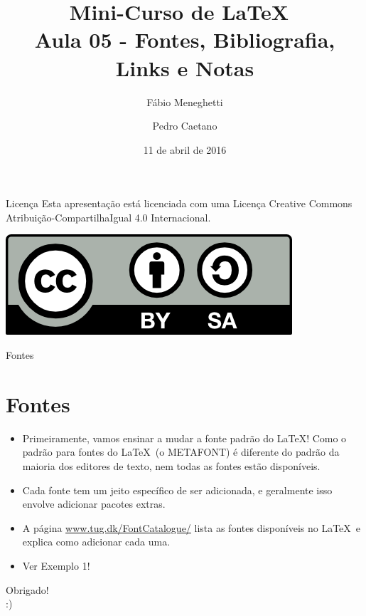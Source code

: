 \documentclass[12pt]{beamer}
\title{Mini-Curso de \LaTeX\ \\ Aula 05 - Fontes, Bibliografia, Links e Notas}
\author{Fábio Meneghetti \and Pedro Caetano}
\date{11 de abril de 2016}
\begin{document}
\begin{frame}
  \titlepage
\end{frame}

\begin{frame}{Licença}
  Esta apresentação está licenciada com uma Licença Creative Commons Atribuição-CompartilhaIgual 4.0 Internacional.
  \begin{center}
    \includegraphics[scale=0.3]{../license.png}
  \end{center}
\end{frame}

\begin{frame}
  \tableofcontents
\end{frame}

\begin{frame}{Fontes}
  \section{Fontes}
  \begin{itemize}
    \item Primeiramente, vamos ensinar a mudar a fonte padrão do \LaTeX! Como o padrão para fontes do \LaTeX\ (o METAFONT) é diferente do padrão da maioria dos editores de texto, nem todas as fontes estão disponíveis.
    \item Cada fonte tem um jeito específico de ser adicionada, e geralmente isso envolve adicionar pacotes extras.
    \item A página \url{www.tug.dk/FontCatalogue/} lista as fontes disponíveis no \LaTeX\ e explica como adicionar cada uma.
    \item Ver Exemplo 1!
  \end{itemize}
\end{frame}

\begin{frame}
  \begin{center}
    \large Obrigado!\\
    :)
  \end{center}
\end{frame}
\end{document}
